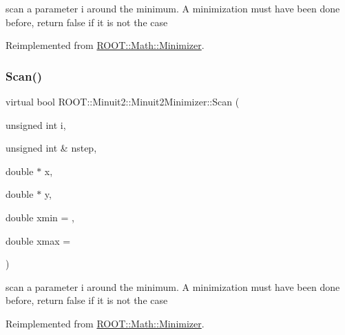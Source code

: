 scan a parameter i around the minimum. A minimization must have been done before, return false if it is not the case 

Reimplemented from \mbox{\hyperlink{classROOT_1_1Math_1_1Minimizer_a1e6e4b32d7338a7a08791cff67f54080}{R\+O\+O\+T\+::\+Math\+::\+Minimizer}}.

\mbox{\label{classROOT_1_1Minuit2_1_1Minuit2Minimizer_a3f2f94c743a9b120a71da5ba23bd88cb}} 
\subsubsection{\texorpdfstring{Scan()}{Scan()}\hspace{0.1cm}{\footnotesize\ttfamily [2/2]}}
{\footnotesize\ttfamily virtual bool R\+O\+O\+T\+::\+Minuit2\+::\+Minuit2\+Minimizer\+::\+Scan (\begin{DoxyParamCaption}\item[{unsigned int}]{i,  }\item[{unsigned int \&}]{nstep,  }\item[{double $\ast$}]{x,  }\item[{double $\ast$}]{y,  }\item[{double}]{xmin = {},  }\item[{double}]{xmax = {} }\end{DoxyParamCaption})\hspace{0.3cm}{\ttfamily [virtual]}}

scan a parameter i around the minimum. A minimization must have been done before, return false if it is not the case 

Reimplemented from \mbox{\hyperlink{classROOT_1_1Math_1_1Minimizer_a1e6e4b32d7338a7a08791cff67f54080}{R\+O\+O\+T\+::\+Math\+::\+Minimizer}}.

\mbox{\label{classROOT_1_1Minuit2_1_1Minuit2Minimizer_af42341b80ebb02d8c0882beaa781e7bd}} 
